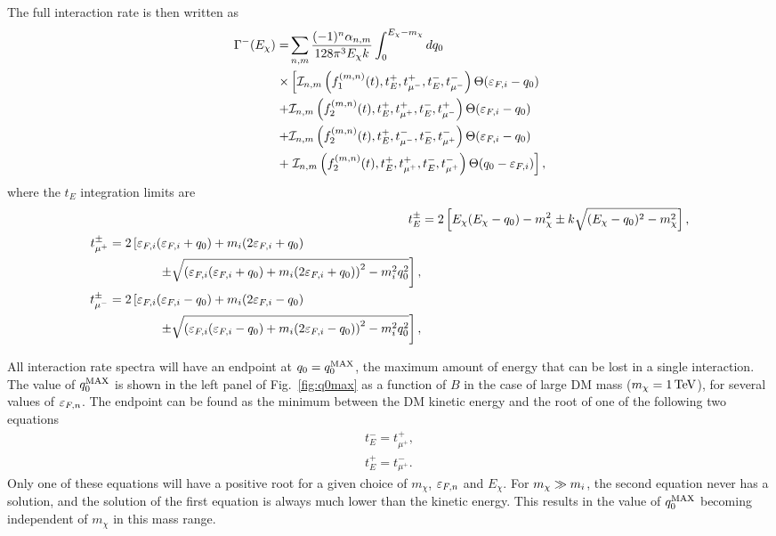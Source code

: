 The full interaction rate is then written as
\begin{align}
    \begin{split}
        \Gamma^{-}(E_\chi)  =& \sum_{n,m}  \frac{(-1)^n \alpha_{n,m}}{128\pi^3 E_\chi k }\int_0^{E_\chi -m_\chi} dq_0  \\
         \times & \left[ \mathcal{I}_{n,m}\left(f_1^{(m,n)}(t),t_E^+,t_{\mu^-}^+,t_E^-,t_{\mu^-}^-\right)\Theta(\varepsilon_{F,i}-q_0)\right.\\
        + & \mathcal{I}_{n,m}\left(f_2^{(m,n)}(t),t_E^+,t_{\mu^+}^+,t_E^-,t_{\mu^-}^+\right)\Theta(\varepsilon_{F,i}-q_0) \\
        + & \mathcal{I}_{n,m}\left(f_2^{(m,n)}(t),t_E^+,t_{\mu^-}^-,t_E^-,t_{\mu^+}^-\right)\Theta(\varepsilon_{F,i}-q_0) \\
        + & \left. \mathcal{I}_{n,m}\left(f_2^{(m,n)}(t),t_E^+,t_{\mu^+}^+,t_E^-,t_{\mu^+}^-\right)\Theta(q_0-\varepsilon_{F,i}) \right], \label{eq:gammafull_app}
    \end{split}
\end{align}
where the $t_E$ integration limits are
\begin{align}
 t_E^\pm &= 2\left[E_\chi(E_\chi-q_0)-m_\chi^2\pm k\sqrt{(E_\chi-q_0)^2-m_\chi^2}\right],\\
 \begin{split}
    t_{\mu^{+}}^\pm &= 2\left[\varepsilon_{F,i}(\varepsilon_{F,i}+q_0)+m_i(2\varepsilon_{F,i}+q_0) \right. \\
    &\hspace{4em}\left.\pm \sqrt{\left(\varepsilon_{F,i}(\varepsilon_{F,i}+q_0)+m_i(2\varepsilon_{F,i}+q_0)\right)^2-m_i^2q_0^2}\right],
 \end{split}\\
 \begin{split}
    t_{\mu^{-}}^\pm &=  2\left[\varepsilon_{F,i}(\varepsilon_{F,i}-q_0)+m_i(2\varepsilon_{F,i}-q_0)\right.\\
    &\hspace{4em}\left.\pm\sqrt{\left(\varepsilon_{F,i}(\varepsilon_{F,i}-q_0)+m_i(2\varepsilon_{F,i}-q_0)\right)^2-m_i^2q_0^2}\right], 
 \end{split}
\end{align}

All interaction rate spectra will have an endpoint at $q_0 = q_0^{\rm MAX}$, the maximum amount of energy that can be lost in a single interaction.
The value of $q_0^{\rm MAX}$ is shown in the left panel of Fig.~\ref{fig:q0max} as a function of $B$ in the case of large DM mass ($m_\chi = 1{\rm \,TeV}$), for several values of $\varepsilon_{F,n}$. The endpoint can be found as the minimum between the DM kinetic energy and the root of one of the following two equations 
\begin{eqnarray}
    t_E^- = t_{\mu^+}^+,\\
    t_E^+ = t_{\mu^+}^-.
\end{eqnarray}
Only one of these equations will have a positive root for a given choice of $m_\chi$, $\varepsilon_{F,n}$ and $E_\chi$.
For $m_\chi\gg m_i$, the second equation never has a solution, and the solution of the first equation is always much lower than the kinetic energy. This results in the value of $q_0^{\rm MAX}$ becoming independent of $m_\chi$ in this mass range.


